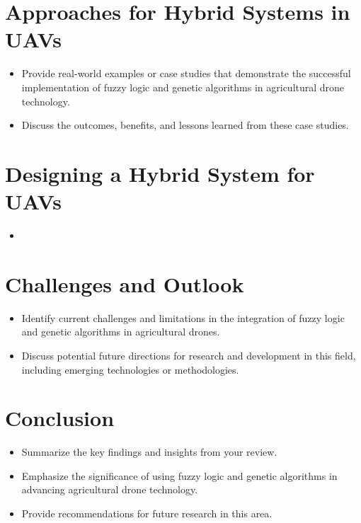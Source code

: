 \documentclass{IEEEtran}
\begin{document}
\section{Approaches for Hybrid Systems in UAVs}
    \begin{itemize}
        \item Provide real-world examples or case studies that demonstrate the successful implementation of fuzzy logic and genetic algorithms in agricultural drone technology.
        \item Discuss the outcomes, benefits, and lessons learned from these case studies.
    \end{itemize}

\section{Designing a Hybrid System for UAVs}
    \begin{itemize}
        \item 
    \end{itemize}

\section{Challenges and Outlook}
    \begin{itemize}
        \item Identify current challenges and limitations in the integration of fuzzy logic and genetic algorithms in agricultural drones.
        \item Discuss potential future directions for research and development in this field, including emerging technologies or methodologies. \cite{key4}
    \end{itemize}

\section{Conclusion}
    \begin{itemize}
        \item Summarize the key findings and insights from your review.
        \item Emphasize the significance of using fuzzy logic and genetic algorithms in advancing agricultural drone technology.
        \item Provide recommendations for future research in this area.
    \end{itemize}



\end{document}
